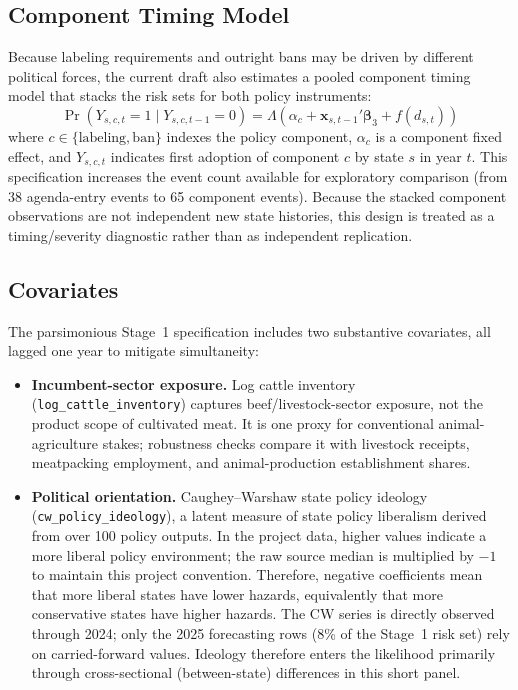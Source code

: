 \documentclass[12pt]{article}
\begin{document}
\subsection{Component Timing Model}

Because labeling requirements and outright bans may be driven by different political forces, the current draft also estimates a pooled component timing model that stacks the risk sets for both policy instruments:
\begin{equation}
    \Pr(Y_{s,c,t} = 1 \mid Y_{s,c,t-1} = 0) = \Lambda\!\left(\alpha_c + \mathbf{x}_{s,t-1}'\boldsymbol{\beta}_3 + f(d_{s,t})\right)
    \label{eq:component}
\end{equation}
where $c \in \{\text{labeling}, \text{ban}\}$ indexes the policy component, $\alpha_c$ is a component fixed effect, and $Y_{s,c,t}$ indicates first adoption of component $c$ by state $s$ in year $t$.  This specification increases the event count available for exploratory comparison (from 38 agenda-entry events to 65 component events).  Because the stacked component observations are not independent new state histories, this design is treated as a timing/severity diagnostic rather than as independent replication.

\subsection{Covariates}
\label{sec:covariates}

The parsimonious Stage~1 specification includes two substantive covariates, all lagged one year to mitigate simultaneity:

\begin{itemize}
    \item \textbf{Incumbent-sector exposure.}  Log cattle inventory (\texttt{log\_cattle\_inventory}) captures beef/livestock-sector exposure, not the product scope of cultivated meat.  It is one proxy for conventional animal-agriculture stakes; robustness checks compare it with livestock receipts, meatpacking employment, and animal-production establishment shares.
    \item \textbf{Political orientation.}  Caughey--Warshaw state policy ideology \citep{caughey2016dynamics} (\texttt{cw\_policy\_ideology}), a latent measure of state policy liberalism derived from over 100 policy outputs.  In the project data, higher values indicate a more liberal policy environment; the raw source median is multiplied by $-1$ to maintain this project convention.  Therefore, negative coefficients mean that more liberal states have lower hazards, equivalently that more conservative states have higher hazards.  The CW series is directly observed through 2024; only the 2025 forecasting rows (8\% of the Stage~1 risk set) rely on carried-forward values.  Ideology therefore enters the likelihood primarily through cross-sectional (between-state) differences in this short panel.
\end{itemize}
\end{document}
